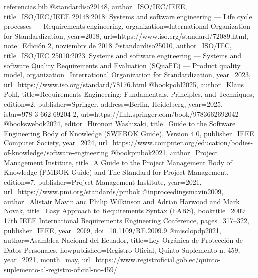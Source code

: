 \begin{filecontents*}{referencias.bib}
@standard{iso29148,
  author={{ISO/IEC/IEEE}},
  title={{ISO/IEC/IEEE 29148:2018}: Systems and software engineering --- Life cycle processes --- Requirements engineering},
  organization={International Organization for Standardization},
  year={2018},
  url={https://www.iso.org/standard/72089.html},
  note={Edici\'on 2, noviembre de 2018}
}
@standard{iso25010,
  author={{ISO/IEC}},
  title={{ISO/IEC 25010:2023}: Systems and software engineering --- Systems and software Quality Requirements and Evaluation (SQuaRE) --- Product quality model},
  organization={International Organization for Standardization},
  year={2023},
  url={https://www.iso.org/standard/78176.html}
}
@book{pohl2025,
  author={Klaus Pohl},
  title={Requirements Engineering: Fundamentals, Principles, and Techniques},
  edition={2},
  publisher={Springer},
  address={Berlin, Heidelberg},
  year={2025},
  isbn={978-3-662-69204-2},
  url={https://link.springer.com/book/9783662692042}
}
@book{swebok2024,
  editor={Hironori Washizaki},
  title={Guide to the Software Engineering Body of Knowledge (SWEBOK Guide), Version 4.0},
  publisher={IEEE Computer Society},
  year={2024},
  url={https://www.computer.org/education/bodies-of-knowledge/software-engineering}
}
@book{pmbok2021,
  author={{Project Management Institute}},
  title={A Guide to the Project Management Body of Knowledge (PMBOK Guide) and The Standard for Project Management},
  edition={7},
  publisher={Project Management Institute},
  year={2021},
  url={https://www.pmi.org/standards/pmbok}
}
@inproceedings{mavin2009,
  author={Alistair Mavin and Philip Wilkinson and Adrian Harwood and Mark Novak},
  title={Easy Approach to Requirements Syntax (EARS)},
  booktitle={2009 17th IEEE International Requirements Engineering Conference},
  pages={317--322},
  publisher={IEEE},
  year={2009},
  doi={10.1109/RE.2009.9}
}
@misc{lopdp2021,
  author={{Asamblea Nacional del Ecuador}},
  title={Ley Org\'anica de Protecci\'on de Datos Personales},
  howpublished={Registro Oficial, Quinto Suplemento n.\textordmasculine{} 459},
  year={2021},
  month=may,
  url={https://www.registroficial.gob.ec/quinto-suplemento-al-registro-oficial-no-459/}
}
\end{filecontents*}
\documentclass[11pt,a4paper]{article}
\usepackage[utf8]{inputenc}
\usepackage[T1]{fontenc}
\usepackage[spanish,es-tabla]{babel}
\usepackage[margin=2.3cm,headheight=18pt]{geometry}
\usepackage{lmodern}
\usepackage{graphicx}
\usepackage{array,booktabs,tabularx,longtable,multirow}
\usepackage{enumitem}
\usepackage[table]{xcolor}
\usepackage{fancyhdr,titlesec,float}
\usepackage{caption}
\usepackage{pdflscape}
\usepackage{hyperref}
\usepackage{cite}
\usepackage{microtype}
\usepackage{lastpage}

